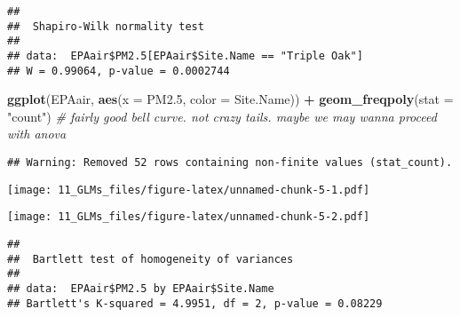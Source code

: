 \documentclass[]{article}
\newenvironment{Shaded}{\begin{snugshade}}{\end{snugshade}}
\newcommand{\KeywordTok}[1]{\textcolor[rgb]{0.13,0.29,0.53}{\textbf{#1}}}
\newcommand{\DataTypeTok}[1]{\textcolor[rgb]{0.13,0.29,0.53}{#1}}
\newcommand{\DecValTok}[1]{\textcolor[rgb]{0.00,0.00,0.81}{#1}}
\newcommand{\StringTok}[1]{\textcolor[rgb]{0.31,0.60,0.02}{#1}}
\newcommand{\CommentTok}[1]{\textcolor[rgb]{0.56,0.35,0.01}{\textit{#1}}}
\newcommand{\OperatorTok}[1]{\textcolor[rgb]{0.81,0.36,0.00}{\textbf{#1}}}
\newcommand{\NormalTok}[1]{#1}
\begin{document}
\begin{verbatim}
## 
##  Shapiro-Wilk normality test
## 
## data:  EPAair$PM2.5[EPAair$Site.Name == "Triple Oak"]
## W = 0.99064, p-value = 0.0002744
\end{verbatim}

\begin{Shaded}
\begin{Highlighting}[]
\KeywordTok{ggplot}\NormalTok{(EPAair, }\KeywordTok{aes}\NormalTok{(}\DataTypeTok{x =}\NormalTok{ PM2.}\DecValTok{5}\NormalTok{, }\DataTypeTok{color =}\NormalTok{ Site.Name)) }\OperatorTok{+}
\StringTok{  }\KeywordTok{geom_freqpoly}\NormalTok{(}\DataTypeTok{stat =} \StringTok{"count"}\NormalTok{) }\CommentTok{# fairly good bell curve. not crazy tails. maybe we may wanna proceed with anova}
\end{Highlighting}
\end{Shaded}

\begin{verbatim}
## Warning: Removed 52 rows containing non-finite values (stat_count).
\end{verbatim}

\texttt{[image: 11\_GLMs\_files/figure-latex/unnamed-chunk-5-1.pdf]}

\begin{Shaded}
\end{Shaded}

\texttt{[image: 11\_GLMs\_files/figure-latex/unnamed-chunk-5-2.pdf]}

\begin{Shaded}
\end{Shaded}

\begin{verbatim}
## 
##  Bartlett test of homogeneity of variances
## 
## data:  EPAair$PM2.5 by EPAair$Site.Name
## Bartlett's K-squared = 4.9951, df = 2, p-value = 0.08229
\end{verbatim}
\end{document}
